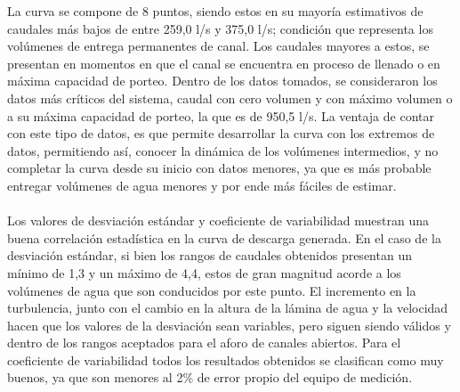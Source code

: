 \documentclass[]{article}
\begin{document}
La curva se compone de 8 puntos, siendo estos en su mayoría estimativos de caudales más bajos de entre 259,0 l/s y 375,0 l/s; condición que representa los volúmenes de entrega permanentes de canal. Los caudales mayores a estos, se presentan en momentos en que el canal se encuentra en proceso de llenado o en máxima capacidad de porteo. Dentro de los datos tomados, se consideraron los datos más críticos del sistema, caudal con cero volumen y con máximo volumen o a su máxima capacidad de porteo, la que es de 950,5 l/s. La ventaja de contar con este tipo de datos, es que permite desarrollar la curva con los extremos de datos, permitiendo así, conocer la dinámica de los volúmenes intermedios, y no completar la curva desde su inicio con datos menores, ya que es más probable entregar volúmenes de agua menores y por ende más fáciles de estimar.\\
\\
Los valores de desviación estándar y coeficiente de variabilidad muestran una buena correlación estadística en la curva de descarga generada. En el caso de la desviación estándar, si bien los rangos de caudales obtenidos presentan un mínimo de 1,3 y un máximo de 4,4, estos de gran magnitud acorde a los volúmenes de agua que son conducidos por este punto. El incremento en la turbulencia, junto con el cambio en la altura de la lámina de agua y la velocidad hacen que los valores de la desviación sean variables, pero siguen siendo válidos y dentro de los rangos aceptados para el aforo de canales abiertos. Para el coeficiente de variabilidad todos los resultados obtenidos se clasifican como muy buenos, ya que son menores al 2\% de error propio del equipo de medición. 
\end{document}
